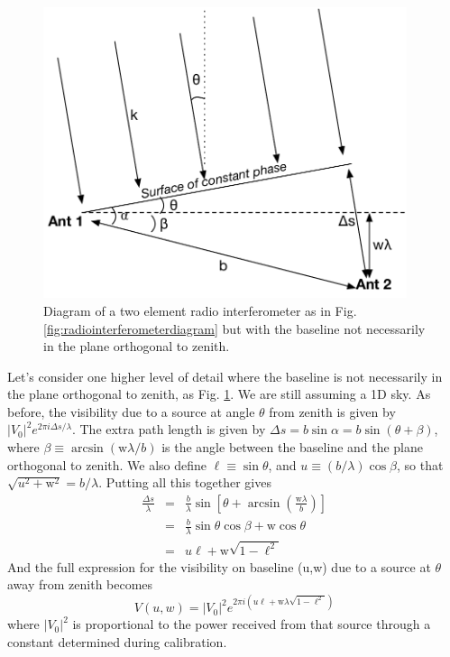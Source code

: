 {\begin{figure}[h]
    \centering
    \includegraphics[width=0.95\textwidth]{chap0_intro/radio_interferometer_diagram_with_w.pdf}
    \caption[Diagram of a two element radio interferometer with non-zero $w$.]{Diagram of a two element radio interferometer as in Fig. \ref{fig:radiointerferometerdiagram} but with the baseline not necessarily in the plane orthogonal to zenith.}
    \label{fig:radiointerferometerdiagramwithw}
\end{figure}

Let's consider one higher level of detail where the baseline is not necessarily in the plane orthogonal to zenith, as Fig. \ref{fig:radiointerferometerdiagramwithw}. 
We are still assuming a 1D sky. As before, the visibility due to a source at angle $\theta$ from zenith is given by $|V_0|^2 e^{2\pi i \Delta s/\lambda}$. 
The extra path length is given by $\Delta s=b\sin\alpha=b\sin(\theta+\beta)$, where $\beta\equiv\arcsin (\text{w}\lambda/b)$ is the angle between the baseline and the plane orthogonal to zenith. 
We also define $\ell\equiv\sin\theta$, and
 $u\equiv (b/\lambda)\cos\beta$, 
 so that $\sqrt{u^2+\text{w}^2}=b/\lambda$. 
 Putting all this together gives
\begin{eqnarray}
	\frac{\Delta s}{\lambda} &=& \frac{b}{\lambda}\sin\left[\theta+\arcsin\left(\frac{\text{w}\lambda}{b}\right)\right]\\
	 &=& \frac{b}{\lambda}\sin\theta\cos\beta+\text{w}\cos\theta\\
	 &=& u\ell+\text{w}\sqrt{1-\ell^2}
\end{eqnarray}
And the full expression for the visibility on baseline (u,w) due to a source at $\theta$ away from zenith becomes 
\begin{equation}
	V(u,w)=|V_0|^2 e^{2\pi i (u\ell+\text{w}\lambda\sqrt{1-\ell^2})}
\end{equation}
where $|V_0|^2$ is proportional to the power received from that source through a constant determined during calibration. 

}
